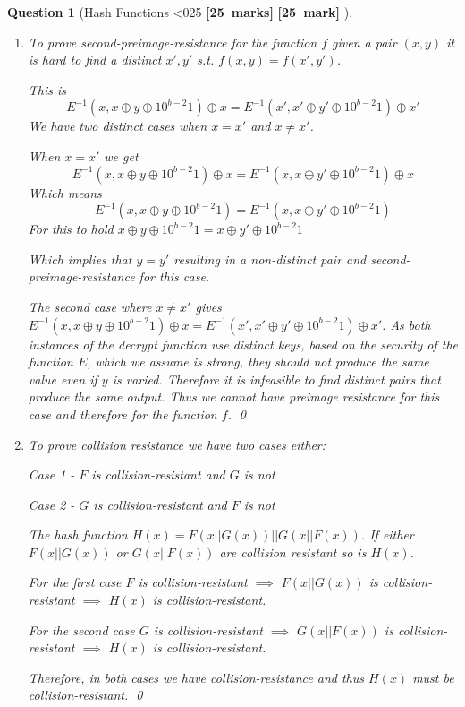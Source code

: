 \documentclass[a4paper]{article}
\theoremstyle{que}
\newtheorem{question}{Question}
\newcommand\points[1]{%
\ifnum1<0#1\relax%
    {\bf \small [#1~marks]}%
  \else%
    {\bf \small [#1~mark]}%
  \fi%
}%
\begin{document}
\begin{question}[Hash Functions \points{25}]
\begin{enumerate}[label=(\alph*)]
    \item To prove second-preimage-resistance for the function \(f\) given a pair \((x,y)\) it is hard to find a distinct \(x',y'\) s.t. \(f(x,y) = f(x',y') \). 
    
    This is \[E^{-1}(x,x \oplus y \oplus 10^{b-2}1) \oplus x = E^{-1}(x',x' \oplus y' \oplus 10^{b-2}1) \oplus x'\]
    We have two distinct cases when \(x = x'\) and \(x \neq x'\). 
    
    When \(x = x'\) we get \[E^{-1}(x,x \oplus y \oplus 10^{b-2}1) \oplus x = E^{-1}(x,x \oplus y' \oplus 10^{b-2}1) \oplus x\]
    Which means \[E^{-1}(x,x \oplus y \oplus 10^{b-2}1) = E^{-1}(x,x \oplus y' \oplus 10^{b-2}1) \]
    For this to hold \(x \oplus y \oplus 10^{b-2}1 = x \oplus y' \oplus 10^{b-2}1 \)

    Which implies that \(y = y'\) resulting in a non-distinct pair and second-preimage-resistance for this case.

    The second case where \(x \neq x'\) gives \(E^{-1}(x,x \oplus y \oplus 10^{b-2}1) \oplus x = E^{-1}(x',x' \oplus y' \oplus 10^{b-2}1) \oplus x'\). As both instances of the decrypt function use distinct keys, based on the security of the function \(E\), which we assume is strong, they should not produce the same value even if \(y\) is varied. Therefore it is infeasible to find distinct pairs that produce the same output. Thus we cannot have preimage resistance for this case and therefore for the function \(f\). \qed
    
    \item To prove collision resistance we have two cases either:

    Case 1 - \(F\) is collision-resistant and \(G\) is not

    Case 2 - \(G\) is collision-resistant and \(F\) is not

    The hash function \(H(x) = F(x||G(x))||G(x||F(x))\). If either \(F(x||G(x))\) or \(G(x||F(x))\) are collision resistant so is \(H(x)\). 

    For the first case \(F\) is collision-resistant \(\implies\) \(F(x||G(x))\) is collision-resistant \(\implies\)  \(H(x)\) is collision-resistant.

    For the second case \(G\) is collision-resistant \(\implies\)  \(G(x||F(x))\) is collision-resistant \(\implies\)  \(H(x)\) is collision-resistant.

    Therefore, in both cases we have collision-resistance and thus \(H(x)\) must be collision-resistant. \qed
  \end{enumerate}
\end{question}
\end{document}
